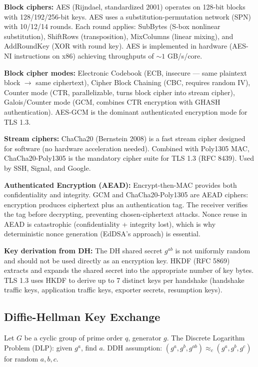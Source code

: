 \textbf{Block ciphers:} AES (Rijndael, standardized 2001) operates on 128-bit blocks with 128/192/256-bit keys. AES uses a substitution-permutation network (SPN) with 10/12/14 rounds. Each round applies: SubBytes (S-box nonlinear substitution), ShiftRows (transposition), MixColumns (linear mixing), and AddRoundKey (XOR with round key). AES is implemented in hardware (AES-NI instructions on x86) achieving throughputs of $\sim 1$ GB/s/core.

\textbf{Block cipher modes:} Electronic Codebook (ECB, insecure — same plaintext block $\to$ same ciphertext), Cipher Block Chaining (CBC, requires random IV), Counter mode (CTR, parallelizable, turns block cipher into stream cipher), Galois/Counter mode (GCM, combines CTR encryption with GHASH authentication). AES-GCM is the dominant authenticated encryption mode for TLS 1.3.

\textbf{Stream ciphers:} ChaCha20 (Bernstein 2008) is a fast stream cipher designed for software (no hardware acceleration needed). Combined with Poly1305 MAC, ChaCha20-Poly1305 is the mandatory cipher suite for TLS 1.3 (RFC 8439). Used by SSH, Signal, and Google.

\textbf{Authenticated Encryption (AEAD):} Encrypt-then-MAC provides both confidentiality and integrity. GCM and ChaCha20-Poly1305 are AEAD ciphers: encryption produces ciphertext plus an authentication tag. The receiver verifies the tag before decrypting, preventing chosen-ciphertext attacks. Nonce reuse in AEAD is catastrophic (confidentiality + integrity lost), which is why deterministic nonce generation (EdDSA's approach) is essential.

\textbf{Key derivation from DH:} The DH shared secret $g^{ab}$ is not uniformly random and should not be used directly as an encryption key. HKDF (RFC 5869) extracts and expands the shared secret into the appropriate number of key bytes. TLS 1.3 uses HKDF to derive up to 7 distinct keys per handshake (handshake traffic keys, application traffic keys, exporter secrets, resumption keys).

\subsection{Diffie-Hellman Key Exchange}
\label{sec:crypto:dh}

Let $G$ be a cyclic group of prime order $q$, generator $g$. The Discrete Logarithm Problem (DLP): given $g^a$, find $a$. DDH assumption: $(g^a, g^b, g^{ab}) \approx_c (g^a, g^b, g^c)$ for random $a,b,c$.

